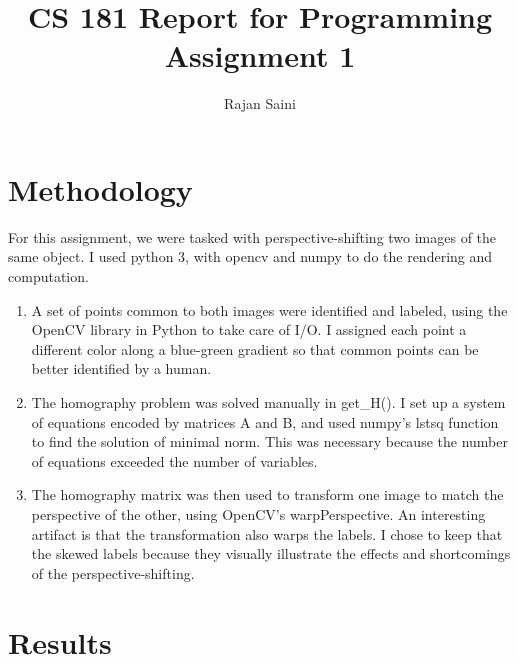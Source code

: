 \documentclass{article}
\title{CS 181 Report for Programming Assignment 1}
\author{Rajan Saini}
\begin{document}
\maketitle
\section{Methodology}
For this assignment, we were tasked with perspective-shifting two images of the same
object. I used python 3, with opencv and numpy to do the rendering and computation.
\begin{enumerate}
\item A set of points common to both images were identified and labeled, using the 
      OpenCV library in Python to take care of I/O. I assigned each point a
      different color along a blue-green gradient so that common points can be
      better identified by a human.
\item The homography problem was solved manually in get\_H(). I set up a system
of equations encoded by matrices A and B, and used numpy's lstsq function to find the
solution of minimal norm. This was necessary because the number of equations 
exceeded the number of variables. 
\item The homography matrix was then used to transform one image to match the
perspective of the other, using OpenCV's warpPerspective. An interesting
artifact is that the transformation also warps the labels. I chose to keep that
the skewed labels because they visually illustrate the effects and shortcomings of the
perspective-shifting.
\end{enumerate}
\section {Results}
\end{document}
